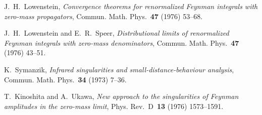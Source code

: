 J.~H.~Lowenstein, \emph{Convergence theorems for renormalized Feynman integrals with zero-mass propagators}, Commun. Math. Phys.~\textbf{47} (1976) \mbox{53--68}.

J.~H.~Lowenstein and E.~R.~Speer, \emph{Distributional limits of renormalized Feynman integrals with zero-mass denominators}, Commun. Math. Phys.~\textbf{47} (1976) \mbox{43--51}.

K.~Symanzik, \emph{Infrared singularities and small-distance-behaviour analysis}, Commun. Math. Phys.~\textbf{34} (1973) \mbox{7--36}.

T.~Kinoshita and A.~Ukawa, \emph{New approach to the singularities of Feynman amplitudes in the zero-mass limit}, Phys. Rev.~D~\textbf{13} (1976) \mbox{1573--1591}.
